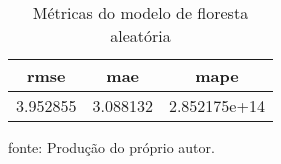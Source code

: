 \begin{table}
\centering
\caption{Métricas do modelo de floresta aleatória}
\label{tab:rf_metrics}
\begin{tabular}{ccc}
\toprule
    rmse &      mae &         mape \\
\midrule
3.952855 & 3.088132 & 2.852175e+14 \\
\bottomrule
\end{tabular}
\par
{\small fonte: Produção do próprio autor.}
\end{table}
